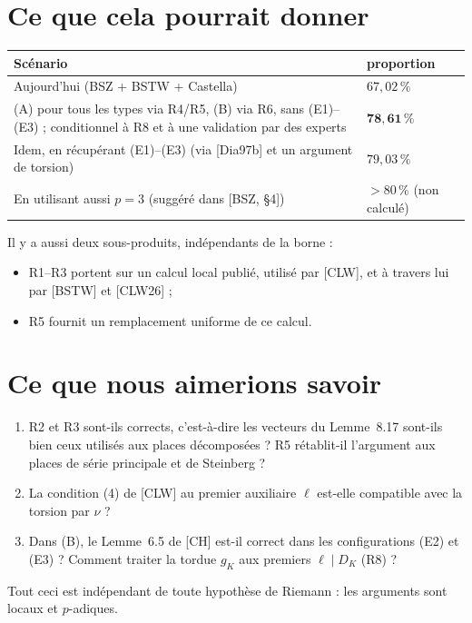 \documentclass[11pt]{amsart}
\begin{document}
\section{Ce que cela pourrait donner}
\begin{center}\small
\begin{tabular}{p{8.3cm}l}
\toprule
Scénario & proportion\\ \midrule
Aujourd'hui (BSZ + BSTW + Castella) & $67{,}02\,\%$\\
(A) pour tous les types via R4/R5, (B) via R6, sans (E1)--(E3) ; conditionnel à R8 et à une validation par des experts & $\mathbf{78{,}61\,\%}$\\
Idem, en récupérant (E1)--(E3) (via [Dia97b] et un argument de torsion) & $79{,}03\,\%$\\
En utilisant aussi $p=3$ (suggéré dans [BSZ, \S4]) & $>80\,\%$ (non calculé)\\ \bottomrule
\end{tabular}
\end{center}
\noindent Il y a aussi deux sous-produits, indépendants de la borne :
\begin{itemize}
\item R1--R3 portent sur un calcul local publié, utilisé par [CLW], et à travers lui par [BSTW] et [CLW26] ;
\item R5 fournit un remplacement uniforme de ce calcul.
\end{itemize}

\section{Ce que nous aimerions savoir}
\begin{enumerate}
\item R2 et R3 sont-ils corrects, c'est-à-dire les vecteurs du Lemme~8.17 sont-ils bien ceux utilisés aux places décomposées ? R5 rétablit-il l'argument aux places de série principale et de Steinberg ?
\item La condition (4) de [CLW] au premier auxiliaire $\ell$ est-elle compatible avec la torsion par $\nu$ ?
\item Dans (B), le Lemme~6.5 de [CH] est-il correct dans les configurations (E2) et (E3) ? Comment traiter la tordue $g_K$ aux premiers $\ell\mid D_K$ (R8) ?
\end{enumerate}
Tout ceci est indépendant de toute hypothèse de Riemann : les arguments sont locaux et $p$-adiques.
\end{document}
